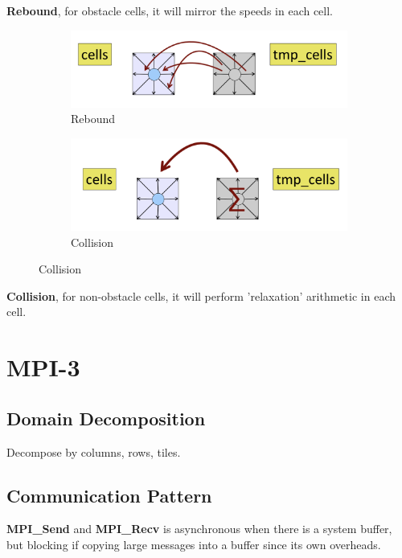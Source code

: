\documentclass{article}
\begin{document}
\textbf{Rebound}, for obstacle cells, it will mirror the speeds in each cell.

\begin{figure}[h]
    \centering
    \begin{subfigure}{0.45\textwidth}
    \includegraphics[scale=0.15]{images/rebound.png} 
    \caption{Rebound}
    \label{fig:my_label}
    \end{subfigure}
    \begin{subfigure}{0.45\textwidth}
    \includegraphics[scale=0.15]{images/collision.png}
    \caption{Collision}
    \label{fig:my_label}
    \end{subfigure}
\end{figure}

\textbf{Collision}, for non-obstacle cells, it will perform ’relaxation’ arithmetic in each cell.


\section{MPI-3}

\subsection{Domain Decomposition}

Decompose by columns, rows, tiles.

\subsection{Communication Pattern}

\textbf{MPI\_Send} and \textbf{MPI\_Recv} is asynchronous when there is a system buffer, but blocking if copying large messages into a buffer since its own overheads.
\end{document}
